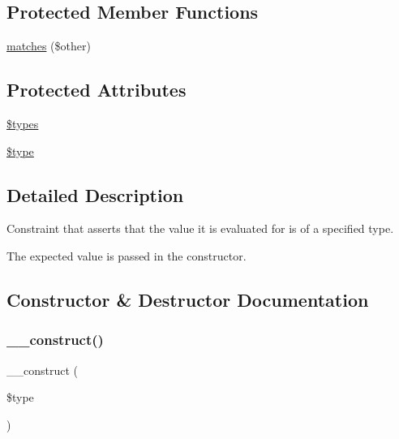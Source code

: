 \subsection*{Protected Member Functions}
\begin{DoxyCompactItemize}
\item 
\mbox{\hyperlink{class_p_h_p_unit___framework___constraint___is_type_a9c9c337de483bbdbb9fa249a6c7c9cc5}{matches}} (\$other)
\end{DoxyCompactItemize}
\subsection*{Protected Attributes}
\begin{DoxyCompactItemize}
\item 
\mbox{\hyperlink{class_p_h_p_unit___framework___constraint___is_type_a92d70a97331cc6fc0a79d9da50895be8}{\$types}}
\item 
\mbox{\hyperlink{class_p_h_p_unit___framework___constraint___is_type_a9a4a6fba2208984cabb3afacadf33919}{\$type}}
\end{DoxyCompactItemize}


\subsection{Detailed Description}
Constraint that asserts that the value it is evaluated for is of a specified type.

The expected value is passed in the constructor. 

\subsection{Constructor \& Destructor Documentation}
\mbox{\label{class_p_h_p_unit___framework___constraint___is_type_ac395571e7767c80119b30cf2e5087c59}} 
\subsubsection{\texorpdfstring{\+\_\+\+\_\+construct()}{\_\_construct()}}
{\footnotesize\ttfamily \+\_\+\+\_\+construct (\begin{DoxyParamCaption}\item[{}]{\$type }\end{DoxyParamCaption})}


